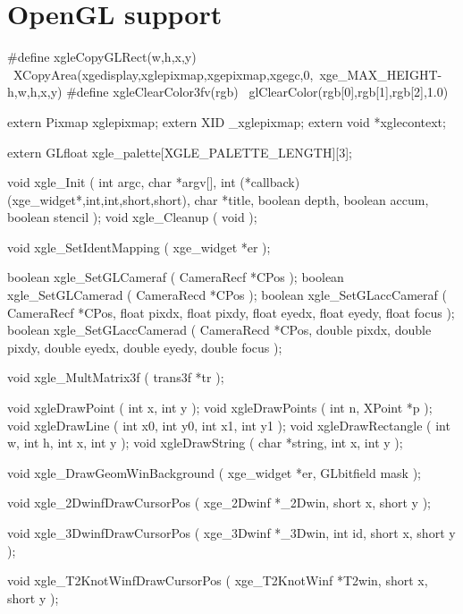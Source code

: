 \section{OpenGL support}

\begin{listingC}
#define xgleCopyGLRect(w,h,x,y) \
  XCopyArea(xgedisplay,xglepixmap,xgepixmap,xgegc,0,\
    xge_MAX_HEIGHT-h,w,h,x,y)
#define xgleClearColor3fv(rgb) \
  glClearColor(rgb[0],rgb[1],rgb[2],1.0)
\end{listingC}

\begin{listingC}
extern Pixmap      xglepixmap;
extern XID         _xglepixmap;
extern void        *xglecontext;

extern GLfloat xgle_palette[XGLE_PALETTE_LENGTH][3];
\end{listingC}

\begin{listingC}
void xgle_Init ( int argc, char *argv[],
                 int (*callback)(xge_widget*,int,int,short,short),
                 char *title,
                 boolean depth, boolean accum, boolean stencil );
void xgle_Cleanup ( void );
\end{listingC}

\begin{listingC}
void xgle_SetIdentMapping ( xge_widget *er );
\end{listingC}

\begin{listingC}
boolean xgle_SetGLCameraf ( CameraRecf *CPos );
boolean xgle_SetGLCamerad ( CameraRecd *CPos );
boolean xgle_SetGLaccCameraf ( CameraRecf *CPos,
                       float pixdx, float pixdy,
                       float eyedx, float eyedy, float focus );
boolean xgle_SetGLaccCamerad ( CameraRecd *CPos,
                       double pixdx, double pixdy,
                       double eyedx, double eyedy, double focus );
\end{listingC}

\begin{listingC}
void xgle_MultMatrix3f ( trans3f *tr );

void xgleDrawPoint ( int x, int y );
void xgleDrawPoints ( int n, XPoint *p );
void xgleDrawLine ( int x0, int y0, int x1, int y1 );
void xgleDrawRectangle ( int w, int h, int x, int y );
void xgleDrawString ( char *string, int x, int y );
\end{listingC}

\begin{listingC}
void xgle_DrawGeomWinBackground ( xge_widget *er, GLbitfield mask );

void xgle_2DwinfDrawCursorPos ( xge_2Dwinf *_2Dwin,
                                short x, short y );

void xgle_3DwinfDrawCursorPos ( xge_3Dwinf *_3Dwin,
                                int id, short x, short y );

void xgle_T2KnotWinfDrawCursorPos ( xge_T2KnotWinf *T2win,
                                    short x, short y );
\end{listingC}


